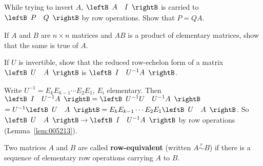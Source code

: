 \begin{multicols}{2}
\begin{ex}
While trying to invert $A$, $\leftB \begin{array}{cc}
A & I
\end{array} \rightB$ is carried to $\leftB \begin{array}{cc}
P & Q
\end{array} \rightB$ by row operations. Show that $P = QA$.
\end{ex}

\begin{ex}
If $A$ and $B$ are $n \times n$ matrices and $AB$ is a product of elementary matrices, show that the same is true of $A$.
\end{ex}

\begin{ex}
If $U$ is invertible, show that the reduced row-echelon form of a matrix $\leftB \begin{array}{cc}
U & A
\end{array} \rightB$ is $\leftB \begin{array}{cc}
I & U^{-1}A
\end{array} \rightB$.

\begin{sol}
Write $U^{-1} = E_{k}E_{k-1} \cdots E_{2}E_{1}$, $E_{i}$ elementary. Then $\leftB \begin{array}{cc}
I & U^{-1}A
\end{array} \rightB = \leftB \begin{array}{cc}
U^{-1}U & U^{-1}A
\end{array} \rightB$ \\
$ = U^{-1} \leftB \begin{array}{cc}
U & A
\end{array} \rightB = E_{k}E_{k-1} \cdots E_{2}E_{1} \leftB \begin{array}{cc}
U & A
\end{array} \rightB$. So $\leftB \begin{array}{cc}
U & A
\end{array} \rightB \rightarrow
\leftB \begin{array}{cc}
I & U^{-1}A
\end{array} \rightB$ by row operations \\ (Lemma~\ref{lem:005213}).
\end{sol}
\end{ex}

\begin{ex}\label{ex:ex2_5_17}
Two matrices $A$ and $B$ are called \textbf{row-equivalent} (written $A \overset{r}{\sim} B$) if there is a sequence of elementary row operations carrying $A$ to $B$.


\end{ex}
\end{multicols}
